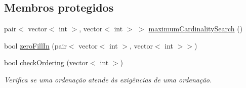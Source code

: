 \subsection*{Membros protegidos}
\begin{DoxyCompactItemize}
\item 
pair$<$ vector$<$ int $>$, vector$<$ int $>$ $>$ \hyperlink{classGraphGen_a7811947062c0aa0fd1c56af0442dc9ad}{maximum\+Cardinality\+Search} ()
\item 
bool \hyperlink{classGraphGen_ad22d4dd7a1006663e1ba653c16b26e1a}{zero\+Fill\+In} (pair$<$ vector$<$ int $>$, vector$<$ int $>$$>$)
\item 
\mbox{\label{classGraphGen_ac4ae31e7a52c9b2227ab8deb47d091a5}} 
bool \hyperlink{classGraphGen_ac4ae31e7a52c9b2227ab8deb47d091a5}{check\+Ordering} (vector$<$ int $>$)
\begin{DoxyCompactList}\small\item\em Verifica se uma ordenação atende às exigências de uma ordenação. \end{DoxyCompactList}\end{DoxyCompactItemize}
